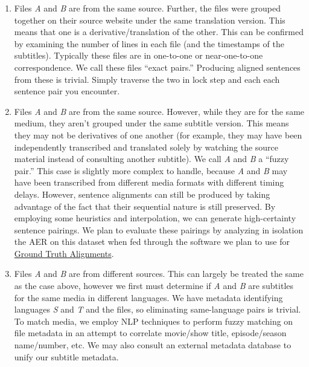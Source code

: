 \documentclass[twoside,twocolumn]{article}
\begin{document}
\begin{enumerate}

    \item Files \textit{A} and \textit{B} are from the same source. Further,
        the files were grouped together on their source website under the same
        translation version. This means that one is a derivative/translation
        of the other. This can be confirmed by examining the number of lines
        in each file (and the timestamps of the subtitles). Typically these
        files are in one-to-one or near-one-to-one correspondence. We call
        these files ``exact pairs.'' Producing aligned sentences from these is
        trivial. Simply traverse the two in lock step and each each sentence
        pair you encounter.

    \item Files \textit{A} and \textit{B} are from the same source. However,
        while they are for the same medium, they aren't grouped under the
        same subtitle version. This means they may not be derivatives of
        one another (for example, they may have been independently transcribed
        and translated solely by watching the source material instead of
        consulting another subtitle). We call \textit{A} and \textit{B} a
        ``fuzzy pair.'' This case is slightly more complex to handle, because
        \textit{A} and \textit{B} may have been transcribed from different
        media formats with different timing delays. However, sentence
        alignments can still be produced by taking advantage of the fact that
        their sequential nature is still preserved. By employing some
        heuristics and interpolation, we can generate high-certainty sentence
        pairings. We plan to evaluate these pairings by analyzing in isolation
        the AER on this dataset when fed through the software we plan to use
        for \hyperref[subsec:ground-truth-alignments]{Ground Truth Alignments}.

    \item Files \textit{A} and \textit{B} are from different sources. This can
        largely be treated the same as the case above, however we first must
        determine if \textit{A} and \textit{B} are subtitles for the same media
        in different languages. We have metadata identifying languages
        \textit{S} and \textit{T} and the files, so eliminating same-language
        pairs is trivial. To match media, we employ NLP techniques to perform
        fuzzy matching on file metadata in an attempt to correlate movie/show
        title, episode/season name/number, etc. We may also consult an external
        metadata database to unify our subtitle metadata.

\end{enumerate}
\end{document}
